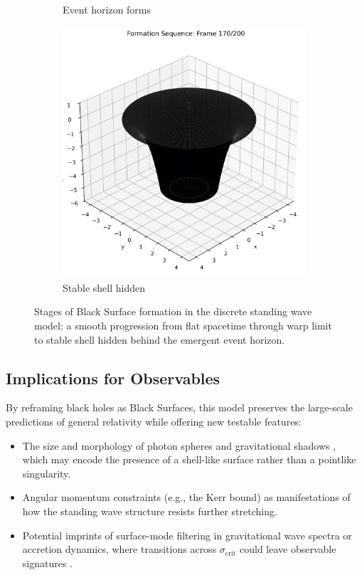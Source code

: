 \documentclass[12pt]{article}
\begin{document}
\begin{figure}[H]
\begin{subfigure}[b]{0.3\textwidth}
    \caption{Event horizon forms}
  \end{subfigure}
  \hfill
  \begin{subfigure}[b]{0.3\textwidth}
    \includegraphics[width=\textwidth]{frame_170.png}
    \caption{Stable shell hidden}
  \end{subfigure}

  \caption{Stages of Black Surface formation in the discrete standing wave model: a smooth progression from flat spacetime through warp limit to stable shell hidden behind the emergent event horizon.}
  \label{fig:black_surface_stages}
\end{figure}

\subsection{Implications for Observables}

By reframing black holes as Black Surfaces, this model preserves the large-scale predictions of general relativity while offering new testable features:
\begin{itemize}
    \item The size and morphology of photon spheres and gravitational shadows \cite{eventhorizon2019}, which may encode the presence of a shell-like surface rather than a pointlike singularity.
    \item Angular momentum constraints (e.g., the Kerr bound) as manifestations of how the standing wave structure resists further stretching.
    \item Potential imprints of surface-mode filtering in gravitational wave spectra or accretion dynamics, where transitions across $\sigma_{\text{crit}}$ could leave observable signatures \cite{abbott2016, cardoso2016}.
\end{itemize}
\end{document}
